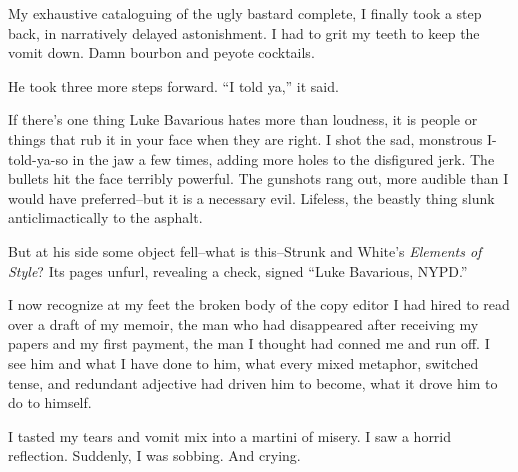 My exhaustive cataloguing of the ugly bastard complete, I finally
took a step back, in narratively delayed astonishment. I had to
grit my teeth to keep the vomit down. Damn bourbon and peyote
cocktails.



He took three more steps forward. ``I told ya,'' it
said.



If there's one thing Luke Bavarious hates more than loudness,
it is people or things that rub it in your face when they are
right. I shot the sad, monstrous I-told-ya-so in the jaw a few
times, adding more holes to the disfigured jerk. The bullets hit
the face terribly powerful. The gunshots rang out, more audible
than I would have preferred--but it is a necessary evil. Lifeless,
the beastly thing slunk anticlimactically to the asphalt.



But at his side some object fell--what is this--Strunk and
White's {\em Elements of Style}? Its pages unfurl, revealing
a check, signed ``Luke Bavarious, NYPD.''



I now recognize at my feet the broken body of the copy editor I had
hired to read over a draft of my memoir, the man who had
disappeared after receiving my papers and my first payment, the man
I thought had conned me and run off. I see him and what I have done
to him, what every mixed metaphor, switched tense, and redundant
adjective had driven him to become, what it drove him to do to
himself.



I tasted my tears and vomit mix into a martini of misery. I saw a
horrid reflection. Suddenly, I was sobbing. And crying. 

 



